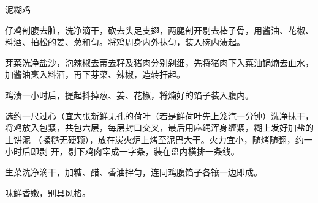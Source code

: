 \begin{recipe}[叫化鸡]{泥糊鸡}

\ingredients


\preparation

\step 仔鸡剖腹去脏，洗净滴干，砍去头足支翅，两腿剖开剔去棒子骨，用酱油、花椒、
料酒、拍松的姜、葱和匀。将鸡周身内外抹匀，装入碗内渍起。

\step 芽菜洗净盐沙，泡辣椒去蒂去籽及猪肉分别剁细，先将猪肉下入菜油锅煵去血水，
加酱油烹入料酒，再下芽菜、辣椒，造转扞起。

\step 鸡渍一小时后，提起抖掉葱、姜、花椒，将煵好的馅子装入腹内。

\step 选约一尺过心（宜大张新鲜无孔的荷叶（若是鲜荷叶先上笼汽一分钟）洗净抹干，
将鸡放入包紧，共包六层，每层封口交叉，最后用麻绳浑身缠紧，糊上发好加盐的土饼泥
（揉糙无硬颗），放在炭火炉上烤至泥巴大干。火力宜小，随烤随翻，约一小时后即剥
开，剔下鸡肉宰成一字条，装在盘内横排一条线。

\step 生菜洗净滴干，加糖、醋、香油拌匀，连同鸡腹馅子各镶一边即成。

\features

味鲜香嫩，别具风格。

\end{recipe}

